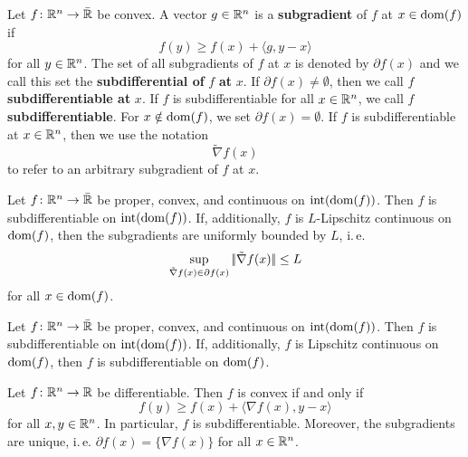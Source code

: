 \begin{definition}[Subgradient]
    \label{def:subgradient}
    Let $f\colon \mathbb{R}^n\to\bar{\mathbb{R}}$ be convex. A vector $g\in\mathbb{R}^n$ is a \textbf{subgradient} of $f$ at $x\in\operatorname{dom}(f)$ if
    \[
        f(y) \geq f(x) + \langle g, y-x \rangle
    \]
    for all $y\in\mathbb{R}^n$.
    The set of all subgradients of $f$ at $x$ is denoted by $\partial f(x)$
    and we call this set the \textbf{subdifferential of} $f$ \textbf{at} $x$.
    If $\partial f(x) \neq \emptyset$, then we call $f$ \textbf{subdifferentiable at} $x$.
    If $f$ is subdifferentiable for all $x\in\mathbb{R}^n$, we call $f$ \textbf{subdifferentiable}.
    For $x\notin\operatorname{dom}(f)$, we set $\partial f(x) = \emptyset$.
    If $f$ is subdifferentiable at $x\in\mathbb{R}^n$, then we use the notation
    \[
        \tilde{\nabla} f(x)
    \]
    to refer to an arbitrary subgradient of $f$ at $x$.
\end{definition}

\begin{proposition}
    \label{prop:convex-lipschitz-then-uniformly-bounded-subgradients}
    Let $f\colon\mathbb{R}^n\to\bar{\mathbb{R}}$ be proper, convex,
    and continuous on $\text{int}(\operatorname{dom}(f))$. Then $f$ is subdifferentiable on
    $\text{int}(\operatorname{dom}(f))$.
    If, additionally, $f$ is
    $L$-Lipschitz continuous on $\operatorname{dom}(f)$, then
    the subgradients are uniformly bounded by $L$, i.\,e.
    \[
        \sup_{\tilde{\nabla} f(x) \in \partial f(x)} |\!| \tilde{\nabla} f(x) |\!| \leq L
    \]
    for all $x\in\operatorname{dom}(f)$.
\end{proposition}

\begin{proposition}
    \label{prop:proper-convex-lipschitz-continuous-implies-subdifferentiable}
    Let $f\colon\mathbb{R}^n\to\bar{\mathbb{R}}$ be proper, convex, and continuous
    on $\text{int}(\operatorname{dom}(f))$. Then $f$ is subdifferentiable on $\text{int}(\operatorname{dom}(f))$.
    If, additionally, $f$ is Lipschitz continuous on $\operatorname{dom}(f)$, then
    $f$ is subdifferentiable on $\operatorname{dom}(f)$.
\end{proposition}

\begin{proposition}
    \label{prop:differentiable-convex-characterization}
    Let $f\colon \mathbb{R}^n\to\mathbb{R}$ be differentiable. Then $f$ is convex if and only if
    \[
        f(y) \geq f(x) + \langle \nabla f(x), y-x \rangle
    \]
    for all $x,y\in\mathbb{R}^n$. In particular, $f$ is subdifferentiable. Moreover, the subgradients are unique, i.\,e.
    $\partial f(x) = \{ \nabla f(x) \}$ for all $x\in\mathbb{R}^n$.
\end{proposition}

